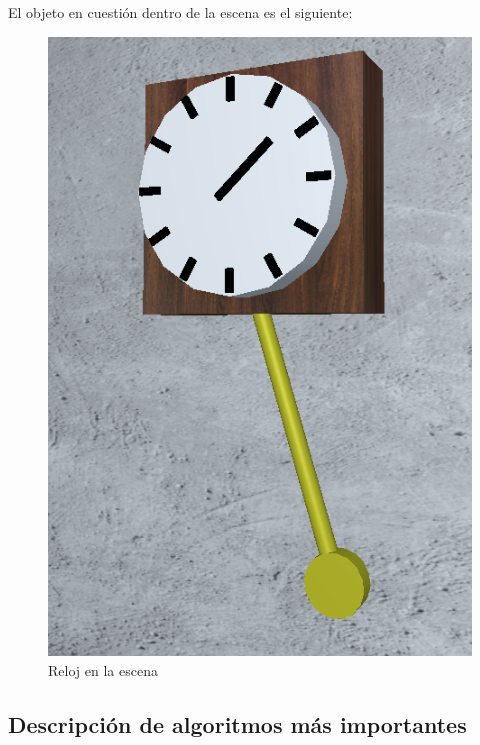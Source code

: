 El objeto en cuestión dentro de la escena es el siguiente:

\begin{figure}[H]
  \centering
  \includegraphics[scale=0.2]{reloj2}
  \caption{Reloj en la escena}
  \label{fig:reloj}
\end{figure}

\subsection{Descripción de algoritmos más importantes}

